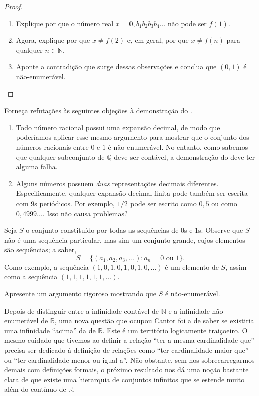 \begin{proof}
\begin{exercise}\label{ex:passos-diagonalizacao}
\begin{enumerate}[label=\alph*)]
\item Explique por que o número real $x = 0{,}b_{1} b_{2} b_{3} b_{4} \dots$ não pode ser $f(1)$.
\item Agora, explique por que $x \neq f(2)$ e, em geral, por que $x \neq f(n)$ para qualquer $n \in \mathbb{N}$.
\item Aponte a contradição que surge dessas observações e conclua que $(0, 1)$ é não-enumerável.
\end{enumerate}
\end{exercise}
\end{proof}

\begin{exercise}\label{ex:objecoes-diagonalizacao}
Forneça refutações às seguintes objeções à demonstração do .
\begin{enumerate}[label=\alph*)]
\item Todo número racional possui uma expansão decimal, de modo que poderíamos aplicar esse mesmo argumento para mostrar que o conjunto dos números racionais entre $0$ e $1$ é não-enumerável. No entanto, como sabemos que qualquer subconjunto de $\mathbb{Q}$ deve ser contável, a demonstração do  deve ter alguma falha.
\item Alguns números possuem \textit{duas} representações decimais diferentes. Especificamente, qualquer expansão decimal finita pode também ser escrita com $9$s periódicos. Por exemplo, $1/2$ pode ser escrito como $0{,}5$ ou como $0{,}4999\dots$. Isso não causa problemas?
\end{enumerate}
\end{exercise}

\begin{exercise}\label{ex:sequencias-01-nao-enumeravel}
Seja $S$ o conjunto constituído por todas as sequências de $0$s e $1$s. Observe que $S$ não é uma sequência particular, mas sim um conjunto grande, cujos elementos são sequências; a saber,
\[
S = \{ (a_{1}, a_{2}, a_{3}, \ldots) : a_{n} = 0 \text{ ou } 1 \}.
\]
Como exemplo, a sequência $(1, 0, 1, 0, 1, 0, 1, 0, \ldots)$ é um elemento de $S$, assim como a sequência $(1, 1, 1, 1, 1, 1, \ldots)$.

Apresente um argumento rigoroso mostrando que $S$ é não-enumerável.
\end{exercise}

Depois de distinguir entre a infinidade contável de $\mathbb{N}$ e a infinidade não-enumerável de $\mathbb{R}$, uma nova questão que ocupou Cantor foi a de saber se existiria uma infinidade ``acima'' da de $\mathbb{R}$. Este é um território logicamente traiçoeiro. O mesmo cuidado que tivemos ao definir a relação ``ter a mesma cardinalidade que'' precisa ser dedicado à definição de relações como ``ter cardinalidade maior que'' ou ``ter cardinalidade menor ou igual a''. Não obstante, sem nos sobrecarregarmos demais com definições formais, o próximo resultado nos dá uma noção bastante clara de que existe uma hierarquia de conjuntos infinitos que se estende muito além do contínuo de $\mathbb{R}$.

